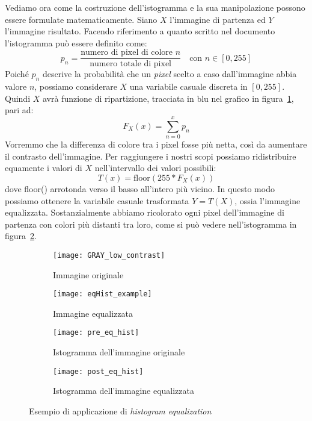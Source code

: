 Vediamo ora come la costruzione dell'istogramma e la sua manipolazione possono essere formulate matematicamente.
Siano $X$ l'immagine di partenza ed $Y$ l'immagine risultato.
Facendo riferimento a quanto scritto nel documento~\cite{hist-eq} l'istogramma può essere definito come:
\begin{equation*}
p_n = \frac{\text{numero di pixel di colore $n$}}{\text{numero totale di pixel}} \quad \text{con $n$} \in [0,255]
\end{equation*}
Poiché $p_n$ descrive la probabilità che un \textit{pixel} scelto a caso dall'immagine abbia valore $n$, possiamo considerare $X$ una variabile casuale discreta in $[0,255]$.
Quindi $X$ avrà funzione di ripartizione, tracciata in blu nel grafico in figura~\ref{fig:hist_pre_eq_example}, pari ad:
\begin{equation*}
  F_X(x) = \sum_{n=0}^{x} p_n
\end{equation*}
Vorremmo che la differenza di colore tra i pixel fosse più netta, così da aumentare il contrasto dell'immagine.
Per raggiungere i nostri scopi possiamo ridistribuire equamente i valori di $X$ nell'intervallo dei valori possibili:
\begin{equation*}
  T(x) = \text{floor}(255 * F_X(x))
\end{equation*}
dove floor() arrotonda verso il basso all'intero più vicino.
In questo modo possiamo ottenere la variabile casuale trasformata $Y=T(X)$, ossia l'immagine equalizzata.
Sostanzialmente abbiamo ricolorato ogni pixel dell'immagine di partenza con colori più distanti tra loro, come si può vedere nell'istogramma in figura~\ref{fig:hist_post_eq_example}.

\clearpage
\begin{figure}[ht]
  \begin{center}
  \begin{subfigure}{.49\linewidth}
    \centering\texttt{[image: GRAY\_low\_contrast]}
    \caption{Immagine originale}
  \end{subfigure}
  \begin{subfigure}{.49\linewidth}
    \centering\texttt{[image: eqHist\_example]}
    \caption{Immagine equalizzata}
  \end{subfigure}
  \begin{subfigure}{.73\linewidth}
    \centering\texttt{[image: pre\_eq\_hist]}
    \caption{Istogramma dell'immagine originale}
    \label{fig:hist_pre_eq_example}
  \end{subfigure}
  \begin{subfigure}{.73\linewidth}
    \centering\texttt{[image: post\_eq\_hist]}
    \caption{Istogramma dell'immagine equalizzata}
    \label{fig:hist_post_eq_example}
  \end{subfigure}
  \end{center}
  \caption{Esempio di applicazione di \textit{histogram equalization}}
    \label{fig:hist_eq_example}
\end{figure}

